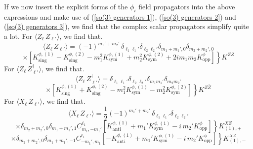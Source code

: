 %
%
If we now insert the explicit forms of the $\phi_i$ field propagators into the above expressions and make use of (\ref{so(3) generators 1}), (\ref{so(3) generators 2}) and (\ref{so(3) generators 3}), we find that the complex scalar propagators simplify quite a lot. For $\langle
Z_{\boldsymbol{\ell}} \, Z_{\boldsymbol{\ell}'}
\rangle$, we find that.
\begin{equation*}
\langle
Z_{\boldsymbol{\ell}} \, Z_{\boldsymbol{\ell}'}
\rangle
=
(-1)^{m_1' + m_2'} \,
\delta_{\ell_1 \ell_1'} \delta_{\ell_2 \ell_2'}
\delta_{m_1+m_1',0} \delta_{m_2 + m_2',0}
\end{equation*}
%
%
\begin{equation}\label{ZZ propagotor}
\times
\left.
\left[
K^{\phi,(1)}_{\mathrm{sing}} - K^{\phi,(2)}_{\mathrm{sing}}
- m_1^2 K^{\phi,(1)}_{\mathrm{sym}}
+ m_2^2 K^{\phi,(2)}_{\mathrm{sym}}
+ 2i m_1 m_2 K^{\phi}_{\mathrm{opp}}
\right]
\right\rbrace { \scriptstyle K^{ZZ} }
\end{equation}
%
%
For $\langle Z_{\boldsymbol{\ell}} \, Z^\dagger_{\boldsymbol{\ell}'} \rangle$, we find that.
%
%
\begin{equation*}
\langle
Z_{\boldsymbol{\ell}} \, Z^\dagger_{\boldsymbol{\ell}'}
\rangle
=
\delta_{\ell_1 \ell_1'} \delta_{\ell_2 \ell_2'}
\delta_{m_1 m_1'} \delta_{m_2 m_2'}
\end{equation*}
%
%
\begin{equation}\label{ZbarZ propagotor}
\times
\left.
\left[
K^{\phi,(1)}_{\mathrm{sing}} + K^{\phi,(2)}_{\mathrm{sing}}
- m_1^2 K^{\phi,(1)}_{\mathrm{sym}}
- m_2^2 K^{\phi,(2)}_{\mathrm{sym}}
\right]
\right\rbrace { \scriptstyle K^{Z\bar{Z}} }
\end{equation}
%
%
For $\langle X_{\boldsymbol{\ell}} \, Z_{\boldsymbol{\ell}'} \rangle$, we find that.
%
%
\begin{equation*}
\langle
X_{\boldsymbol{\ell}} \, Z_{\boldsymbol{\ell}'}
\rangle
=
\frac{1}{2} (-1)^{m_1' + m_2'} \,
\delta_{\ell_1 \ell_1'} \delta_{\ell_2 \ell_2'}
\end{equation*}
%
%
\begin{equation*}
\times
\delta_{m_2 + m_2',0} \delta_{m_1 + m_1',1} C^{\ell_1}_{m_1,-m_1'}
\left.
\left[
K^{\phi,(1)}_{\text{anti}}
+
m_1' K^{\phi,(1)}_{\text{sym}}
-
i \, m_2' K^{\phi}_{\text{opp}}
\right]
\right\rbrace { \scriptstyle K^{XZ}_{(1),+} }
\end{equation*}
%
%
\begin{equation*}
\times
\delta_{m_2 + m_2',0} \delta_{m_1 + m_1',-1} C^{\ell_1}_{-m_1',m_1}
\left.
\left[
-
K^{\phi,(1)}_{\text{anti}}
+
m_1' K^{\phi,(1)}_{\text{sym}}
-
i \, m_2' K^{\phi}_{\text{opp}}
\right]
\right\rbrace { \scriptstyle K^{XZ}_{(1),-} }
\end{equation*}
